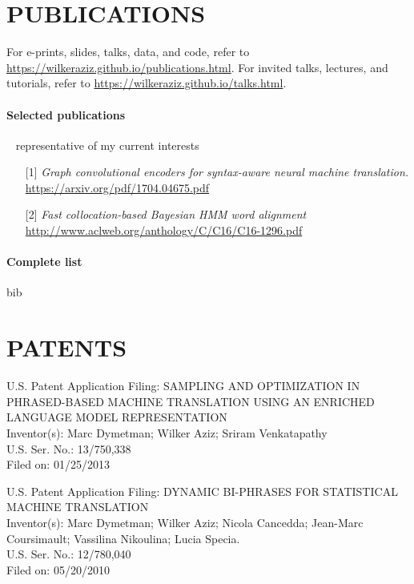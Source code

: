 \section*{PUBLICATIONS}

For e-prints, slides, talks, data, and code, refer to \url{https://wilkeraziz.github.io/publications.html}. 
For invited talks, lectures, and tutorials, refer to \url{https://wilkeraziz.github.io/talks.html}.



\paragraph{Selected publications} ~ representative of my current interests
\begin{itemize}
	\item[] [1] \emph{Graph convolutional encoders for syntax-aware neural machine translation.} \\
	\url{https://arxiv.org/pdf/1704.04675.pdf}
	\item[] [2] \emph{Fast collocation-based Bayesian HMM word alignment} \\
	\url{http://www.aclweb.org/anthology/C/C16/C16-1296.pdf}
\end{itemize}

\paragraph{Complete list}


\begin{btSect}{bib}
\btPrintNotCited
\end{btSect}


\section*{PATENTS}

\begin{description}
\item U.S. Patent Application Filing: SAMPLING AND OPTIMIZATION IN PHRASED-BASED MACHINE TRANSLATION USING AN ENRICHED LANGUAGE MODEL REPRESENTATION \\
Inventor(s): Marc Dymetman; Wilker Aziz; Sriram Venkatapathy \\
U.S. Ser. No.:  13/750,338 \\
Filed on: 01/25/2013 
\end{description}

\begin{description}
\item U.S. Patent Application Filing: DYNAMIC BI-PHRASES FOR STATISTICAL MACHINE TRANSLATION  \\
Inventor(s): Marc Dymetman; Wilker Aziz; Nicola Cancedda; Jean-Marc Coursimault;  Vassilina Nikoulina; Lucia Specia. \\
U.S. Ser. No.:  12/780,040 \\
Filed on: 05/20/2010  \\
\end{description}